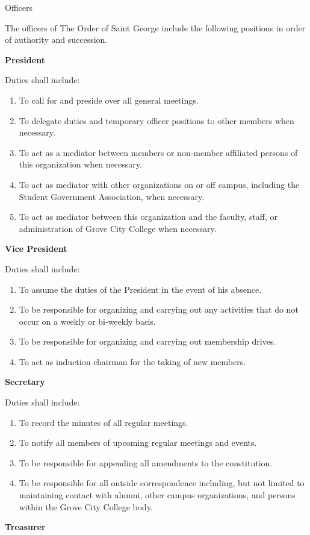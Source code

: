 {
\begin{article}{Officers}
	\item The officers of The Order of Saint George include the following positions in order of authority and succession.

	\item \textbf{President}

	Duties shall include:
	\begin{enumerate}
		\item To call for and preside over all general meetings.
		\item To delegate duties and temporary officer positions to other members when necessary.
		\item To act as a mediator between members or non-member affiliated persons of this organization when necessary.
		\item To act as mediator with other organizations on or off campus, including the Student Government Association, when necessary.
		\item To act as mediator between this organization and the faculty, staff, or administration of Grove City College when necessary.
	\end{enumerate}
	\item \textbf{Vice President}

	Duties shall include:
	\begin{enumerate}
		\item To assume the duties of the President in the event of his absence.
		\item To be responsible for organizing and carrying out any activities that do not occur on a weekly or bi-weekly basis.
		\item To be responsible for organizing and carrying out membership drives.
		\item To act as induction chairman for the taking of new members.
	\end{enumerate}
	\item \textbf{Secretary}

	Duties shall include:
	\begin{enumerate}
		\item To record the minutes of all regular meetings.
		\item To notify all members of upcoming regular meetings and events.
		\item To be responsible for appending all amendments to the constitution.
		\item To be responsible for all outside correspondence including, but not limited to maintaining contact with alumni, other campus organizations, and persons within the Grove City College body.
	\end{enumerate}
	\item \textbf{Treasurer}


\end{article}}
